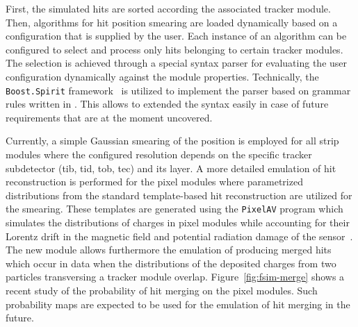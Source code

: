 First, the simulated hits are sorted according the associated tracker module. Then, algorithms for hit position smearing are loaded dynamically based on a configuration that is supplied by the user. Each instance of an algorithm can be configured to select and process only hits belonging to certain tracker modules. The selection is achieved through a special syntax parser for evaluating the user configuration dynamically against the module properties. Technically, the \texttt{Boost.Spirit} framework~\cite{boostspirit} is utilized to implement the parser based on grammar rules written in . This allows to extended the syntax easily in case of future requirements that are at the moment uncovered.

Currently, a simple Gaussian smearing of the position is employed for all strip modules where the configured resolution depends on the specific tracker subdetector (\gls{tib}, \gls{tid}, \gls{tob}, \gls{tec}) and its layer. A more detailed emulation of hit reconstruction is performed for the pixel modules where parametrized distributions from the standard template-based hit reconstruction are utilized for the smearing. These templates are generated using the \texttt{PixelAV} program which simulates the distributions of charges in pixel modules while accounting for their Lorentz drift in the magnetic field and potential radiation damage of the sensor~\cite{Swartz:2002kda}. The new \FSIM module allows furthermore the emulation of producing merged hits which occur in data when the distributions of the deposited charges from two particles transversing a tracker module overlap. Figure~\ref{fig:fsim-merge} shows a recent study of the probability of hit merging on the pixel modules. Such probability maps are expected to be used for the emulation of hit merging in the future.






